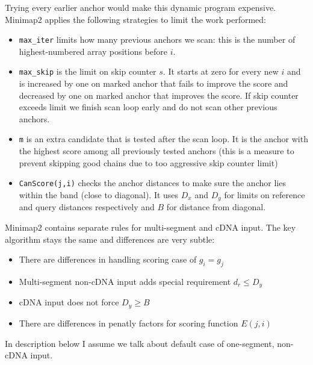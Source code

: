 Trying every earlier anchor would make this dynamic program expensive. Minimap2 applies the following strategies to limit the work performed:
\begin{itemize}
  \item \texttt{max\_iter} limits how many previous anchors we scan: this is the number of highest-numbered array positions before \(i\).
  \item \texttt{max\_skip} is the limit on skip counter \(s\). It starts at zero for every new \(i\) and is increased by one on marked anchor that fails to improve the score and decreased by one on marked anchor that improves the score. If skip counter exceeds limit we finish scan loop early and do not scan other previous anchors.
  \item \texttt{m} is an extra candidate that is tested after the scan loop. It is the anchor with the highest score among all previously tested anchors (this is a measure to prevent skipping good chains due to too aggressive skip counter limit)
  \item \texttt{CanScore(j,i)} checks the anchor distances to make sure the anchor lies within the band (close to diagonal). It uses $D_x$ and $D_y$ for limits on reference and query distances respectively and $B$ for distance from diagonal.
\end{itemize}

Minimap2 contains separate rules for multi-segment and cDNA input. The key algorithm stays the same and differences are very subtle:
\begin{itemize}
  \item There are differences in handling scoring case of \(g_i=g_j\)
  \item Multi-segment non-cDNA input adds special requirement \(d_r\leq D_y\)
  \item cDNA input does not force \(D_y\geq B\)
  \item There are differences in penatly factors for scoring function $E(j,i)$
\end{itemize}

In description below I assume we talk about default case of one-segment, non-cDNA input.


